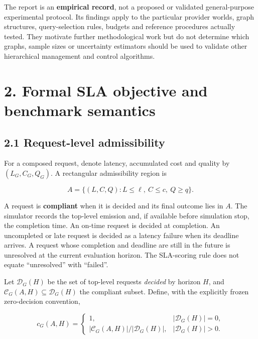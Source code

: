 \documentclass[10pt,a4paper]{article}
\begin{document}
The report is an \textbf{empirical record}, not a proposed or validated general-purpose experimental protocol. Its findings apply to the particular provider worlds, graph structures, query-selection rules, budgets and reference procedures actually tested. They motivate further methodological work but do not determine which graphs, sample sizes or uncertainty estimators should be used to validate other hierarchical management and control algorithms.

\section*{2. Formal SLA objective and benchmark semantics}

\subsection*{2.1 Request-level admissibility}

For a composed request, denote latency, accumulated cost and quality by $(L_G,C_G,Q_G)$. A rectangular admissibility region is

\begin{equation*}
A=\{(L,C,Q): L\le\ell,\ C\le c,\ Q\ge q\}.
\end{equation*}

A request is \textbf{compliant} when it is decided and its final outcome lies in $A$. The simulator records the top-level emission and, if available before simulation stop, the completion time. An on-time request is decided at completion. An uncompleted or late request is decided as a latency failure when its deadline arrives. A request whose completion and deadline are still in the future is unresolved at the current evaluation horizon. The SLA-scoring rule does not equate “unresolved” with “failed”.

Let $\mathcal D_G(H)$ be the set of top-level requests \emph{decided} by horizon $H$, and $\mathcal C_G(A,H)\subseteq\mathcal D_G(H)$ the compliant subset. Define, with the explicitly frozen zero-decision convention,

\begin{equation*}
c_G(A,H)=
\begin{cases}
1, &|\mathcal D_G(H)|=0,\\[2mm]
|\mathcal C_G(A,H)|/|\mathcal D_G(H)|, &|\mathcal D_G(H)|>0.
\end{cases}
\tag{3}
\end{equation*}
\end{document}
